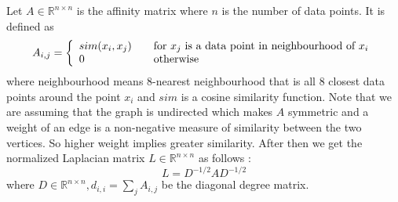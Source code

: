 Let $A \in \mathbb{R}^{n \times n}$ is the affinity matrix where $n$ is the number of data points. It is defined as 
\begin{equation}
\label{eq:sim}
A_{i,j} = \left\{ 
  \begin{array}{l l}
    sim(x_i, x_j) & \quad \text{for $x_j$ is a data point in neighbourhood of $x_i$}\\
    0 & \quad \text{otherwise}
  \end{array} \right.
\end{equation}
where neighbourhood means 8-nearest neighbourhood that is all 8 closest data points around the point $x_i$
and $sim$ is a cosine similarity function. 
Note that we are assuming that the graph is undirected which makes $A$ symmetric and a weight of an edge is a non-negative measure of similarity between the two vertices. 
So higher weight implies greater similarity. 
After then we get the normalized Laplacian matrix $L \in \mathbb{R}^{n \times n}$ as follows : 
\begin{equation}
L = D^{-1/2} A D^{-1/2}
\end{equation}
where $D \in \mathbb{R}^{n \times n}, d_{i,i} = \sum_{j} A_{i,j}$ be the diagonal degree matrix. 

